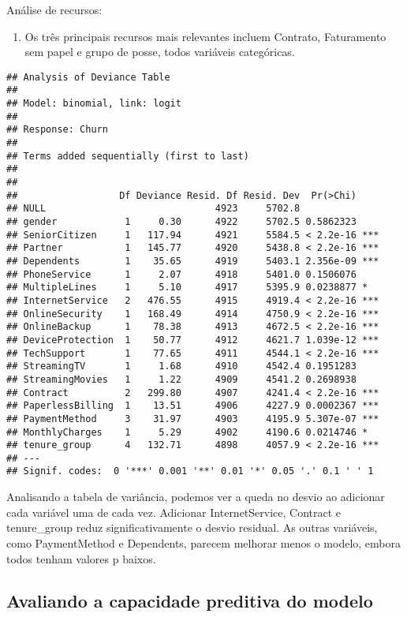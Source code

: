 \documentclass[]{article}
\providecommand{\tightlist}{%
  \setlength{\itemsep}{0pt}\setlength{\parskip}{0pt}}
\begin{document}
Análise de recursos:

\begin{enumerate}
\def\labelenumi{\arabic{enumi}.}
\tightlist
\item
  Os três principais recursos mais relevantes incluem Contrato,
  Faturamento sem papel e grupo de posse, todos variáveis categóricas.
\end{enumerate}

\begin{verbatim}
## Analysis of Deviance Table
## 
## Model: binomial, link: logit
## 
## Response: Churn
## 
## Terms added sequentially (first to last)
## 
## 
##                  Df Deviance Resid. Df Resid. Dev  Pr(>Chi)    
## NULL                              4923     5702.8              
## gender            1     0.30      4922     5702.5 0.5862323    
## SeniorCitizen     1   117.94      4921     5584.5 < 2.2e-16 ***
## Partner           1   145.77      4920     5438.8 < 2.2e-16 ***
## Dependents        1    35.65      4919     5403.1 2.356e-09 ***
## PhoneService      1     2.07      4918     5401.0 0.1506076    
## MultipleLines     1     5.10      4917     5395.9 0.0238877 *  
## InternetService   2   476.55      4915     4919.4 < 2.2e-16 ***
## OnlineSecurity    1   168.49      4914     4750.9 < 2.2e-16 ***
## OnlineBackup      1    78.38      4913     4672.5 < 2.2e-16 ***
## DeviceProtection  1    50.77      4912     4621.7 1.039e-12 ***
## TechSupport       1    77.65      4911     4544.1 < 2.2e-16 ***
## StreamingTV       1     1.68      4910     4542.4 0.1951283    
## StreamingMovies   1     1.22      4909     4541.2 0.2698938    
## Contract          2   299.80      4907     4241.4 < 2.2e-16 ***
## PaperlessBilling  1    13.51      4906     4227.9 0.0002367 ***
## PaymentMethod     3    31.97      4903     4195.9 5.307e-07 ***
## MonthlyCharges    1     5.29      4902     4190.6 0.0214746 *  
## tenure_group      4   132.71      4898     4057.9 < 2.2e-16 ***
## ---
## Signif. codes:  0 '***' 0.001 '**' 0.01 '*' 0.05 '.' 0.1 ' ' 1
\end{verbatim}

Analisando a tabela de variância, podemos ver a queda no desvio ao
adicionar cada variável uma de cada vez. Adicionar InternetService,
Contract e tenure\_group reduz significativamente o desvio residual. As
outras variáveis, como PaymentMethod e Dependents, parecem melhorar
menos o modelo, embora todos tenham valores p baixos.

\hypertarget{avaliando-a-capacidade-preditiva-do-modelo}{%
\subsection{Avaliando a capacidade preditiva do
modelo}\label{avaliando-a-capacidade-preditiva-do-modelo}}
\end{document}
